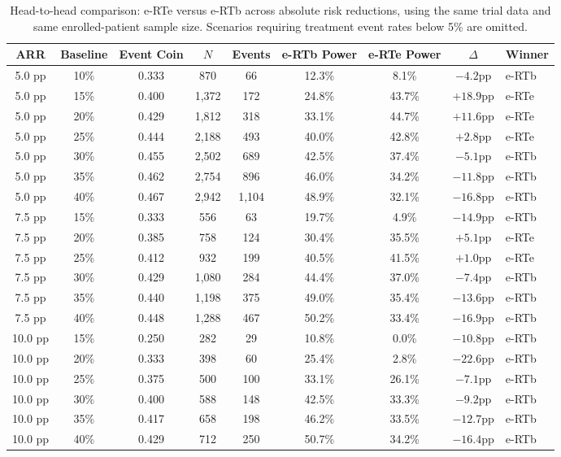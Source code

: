 \begin{table}[htbp]
\centering
\small
\caption{Head-to-head comparison: e-RTe versus e-RTb across absolute risk reductions, using the same trial data and same enrolled-patient sample size. Scenarios requiring treatment event rates below 5\% are omitted.}
\begin{tabular}{@{}ccccccccl@{}}
\toprule
ARR & Baseline & Event Coin & $N$ & Events & e-RTb Power & e-RTe Power & $\Delta$ & Winner \\
\midrule
5.0 pp & 10\% & 0.333 & 870 & 66 & 12.3\% & 8.1\% & $-4.2$pp & e-RTb \\
5.0 pp & 15\% & 0.400 & 1{,}372 & 172 & 24.8\% & 43.7\% & $+18.9$pp & e-RTe \\
5.0 pp & 20\% & 0.429 & 1{,}812 & 318 & 33.1\% & 44.7\% & $+11.6$pp & e-RTe \\
5.0 pp & 25\% & 0.444 & 2{,}188 & 493 & 40.0\% & 42.8\% & $+2.8$pp & e-RTe \\
5.0 pp & 30\% & 0.455 & 2{,}502 & 689 & 42.5\% & 37.4\% & $-5.1$pp & e-RTb \\
5.0 pp & 35\% & 0.462 & 2{,}754 & 896 & 46.0\% & 34.2\% & $-11.8$pp & e-RTb \\
5.0 pp & 40\% & 0.467 & 2{,}942 & 1{,}104 & 48.9\% & 32.1\% & $-16.8$pp & e-RTb \\
7.5 pp & 15\% & 0.333 & 556 & 63 & 19.7\% & 4.9\% & $-14.9$pp & e-RTb \\
7.5 pp & 20\% & 0.385 & 758 & 124 & 30.4\% & 35.5\% & $+5.1$pp & e-RTe \\
7.5 pp & 25\% & 0.412 & 932 & 199 & 40.5\% & 41.5\% & $+1.0$pp & e-RTe \\
7.5 pp & 30\% & 0.429 & 1{,}080 & 284 & 44.4\% & 37.0\% & $-7.4$pp & e-RTb \\
7.5 pp & 35\% & 0.440 & 1{,}198 & 375 & 49.0\% & 35.4\% & $-13.6$pp & e-RTb \\
7.5 pp & 40\% & 0.448 & 1{,}288 & 467 & 50.2\% & 33.4\% & $-16.9$pp & e-RTb \\
10.0 pp & 15\% & 0.250 & 282 & 29 & 10.8\% & 0.0\% & $-10.8$pp & e-RTb \\
10.0 pp & 20\% & 0.333 & 398 & 60 & 25.4\% & 2.8\% & $-22.6$pp & e-RTb \\
10.0 pp & 25\% & 0.375 & 500 & 100 & 33.1\% & 26.1\% & $-7.1$pp & e-RTb \\
10.0 pp & 30\% & 0.400 & 588 & 148 & 42.5\% & 33.3\% & $-9.2$pp & e-RTb \\
10.0 pp & 35\% & 0.417 & 658 & 198 & 46.2\% & 33.5\% & $-12.7$pp & e-RTb \\
10.0 pp & 40\% & 0.429 & 712 & 250 & 50.7\% & 34.2\% & $-16.4$pp & e-RTb \\
\bottomrule
\end{tabular}
\label{tab:compare_erte_binary}
\end{table}
